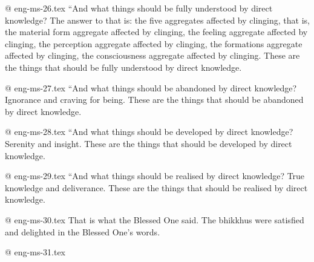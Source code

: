 @ eng-ms-26.tex
“And what things should be fully understood by direct knowledge? The answer to that is: the five aggregates affected by clinging, that is, the material form aggregate affected by clinging, the feeling aggregate affected by clinging, the perception aggregate affected by clinging, the formations aggregate affected by clinging, the consciousness aggregate affected by clinging. These are the things that should be fully understood by direct knowledge.

@ eng-ms-27.tex
“And what things should be abandoned by direct knowledge? Ignorance and craving for being. These are the things that should be abandoned by direct knowledge.

@ eng-ms-28.tex
“And what things should be developed by direct knowledge? Serenity and insight. These are the things that should be developed by direct knowledge.

@ eng-ms-29.tex
“And what things should be realised by direct knowledge? True knowledge and deliverance. These are the things that should be realised by direct knowledge.

@ eng-ms-30.tex
That is what the Blessed One said. The bhikkhus were satisfied and delighted in the Blessed One’s words.

@ eng-ms-31.tex
